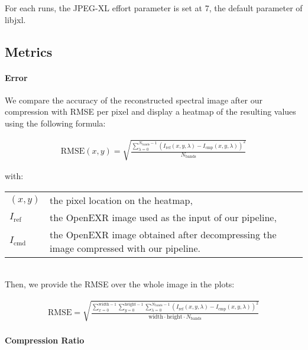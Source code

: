 For each runs, the JPEG-XL effort parameter is set at 7, the default parameter of libjxl.

\subsection{Metrics}

\paragraph{Error}
We compare the accuracy of the reconstructed spectral image after our compression with RMSE per pixel and display a heatmap of the resulting values using the following formula:

\begin{align}
    \mathrm{RMSE}(x, y) = \sqrt{\frac{\sum_{\lambda = 0}^{N_\mathrm{bands} - 1} \left(I_\mathrm{ref}(x, y, \lambda) - I_\mathrm{cmp}(x, y, \lambda) \right)^2}{N_\mathrm{bands}}}
\end{align}

with:

\begin{tabularx}{\linewidth}{lX}
    $(x, y)$ & the pixel location on the heatmap, \\
    $I_\mathrm{ref}$ & the OpenEXR image used as the input of our pipeline, \\
    $I_\mathrm{cmd}$ & the OpenEXR image obtained after decompressing the image compressed with our pipeline. \\
\end{tabularx}\\

Then, we provide the RMSE over the whole image in the plots:

\begin{align}
    \mathrm{RMSE} =
        \sqrt{
            \frac{
                    \sum_{x = 0}^{\mathrm{width} - 1} \sum_{y = 0}^{\mathrm{height} - 1} \sum_{\lambda = 0}^{N_\mathrm{bands} - 1}
                        \left(
                            I_\mathrm{ref}(x, y, \lambda) - I_\mathrm{cmp}(x, y, \lambda)
                        \right)^2
                }
                {\mathrm{width} \cdot \mathrm{height} \cdot N_\mathrm{bands}}
        }
\end{align}


\paragraph{Compression Ratio}

